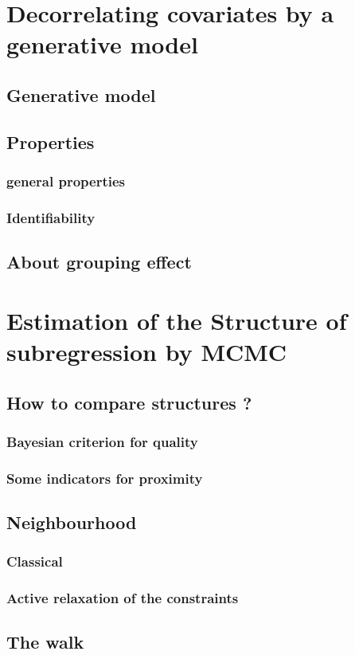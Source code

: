 \documentclass[11pt,a4paper]{report}
\begin{document}
\chapter{Decorrelating covariates by a generative model}
	\section{Generative model}
	\section{Properties}
		\subsection{general properties}
		\subsection{Identifiability}
	\section{About grouping effect}
\chapter{Estimation of the Structure of subregression by MCMC}
	\section{How to compare structures ?}
		\subsection{Bayesian criterion for quality}
		\subsection{Some indicators for proximity}
	\section{Neighbourhood}
		\subsection{Classical}
		\subsection{Active relaxation of the constraints}
	\section{The walk}
\end{document}
